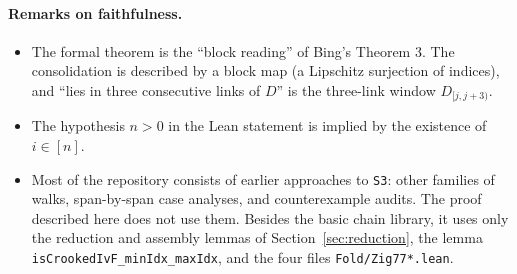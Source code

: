 \documentclass[11pt]{article}
\theoremstyle{definition}
\theoremstyle{remark}
\newcommand{\lean}[1]{\texttt{#1}}
\begin{document}
\paragraph{Remarks on faithfulness.}
\begin{sloppypar}
\begin{itemize}
\item The formal theorem is the ``block reading'' of Bing's Theorem 3. The
consolidation is described by a block map (a Lipschitz surjection of indices),
and ``lies in three consecutive links of $D$'' is the three-link window
$D_{[j,j+3)}$.
\item The hypothesis $n>0$ in the Lean statement is implied by the existence of
$i\in[n]$.
\item Most of the repository consists of earlier approaches to \lean{S3}: other
families of walks, span-by-span case analyses, and counterexample audits. The
proof described here does not use them. Besides the basic chain library, it
uses only the reduction and assembly lemmas of Section~\ref{sec:reduction}, the
lemma \lean{isCrookedIvF\_minIdx\_maxIdx}, and the four files
\lean{Fold/Zig77*.lean}.
\end{itemize}
\end{sloppypar}
\end{document}
